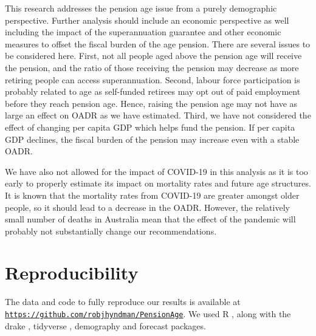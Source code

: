 \documentclass[11pt,a4paper,]{article}
\begin{document}
This research addresses the pension age issue from a purely demographic perspective. Further analysis should include an economic perspective as well including the impact of the superannuation guarantee and other economic measures to offset the fiscal burden of the age pension. There are several issues to be considered here. First, not all people aged above the pension age will receive the pension, and the ratio of those receiving the pension may decrease as more retiring people can access superannuation. Second, labour force participation is probably related to age as self-funded retirees may opt out of paid employment before they reach pension age. Hence, raising the pension age may not have as large an effect on OADR as we have estimated. Third, we have not considered the effect of changing per capita GDP which helps fund the pension. If per capita GDP declines, the fiscal burden of the pension may increase even with a stable OADR.

We have also not allowed for the impact of COVID-19 in this analysis as it is too early to properly estimate its impact on mortality rates and future age structures. It is known that the mortality rates from COVID-19 are greater amongst older people, so it should lead to a decrease in the OADR. However, the relatively small number of deaths in Australia mean that the effect of the pandemic will probably not substantially change our recommendations.

\hypertarget{reproducibility}{%
\section*{Reproducibility}\label{reproducibility}}

The data and code to fully reproduce our results is available at \href{https://github.com/robjhyndman/PensionAge}{\texttt{https://github.com/robjhyndman/PensionAge}}. We used R \autocite{RCore}, along with the drake \autocite{Rdrake}, tidyverse \autocite{Rtidyverse}, demography \autocite{Rdemography} and forecast \autocite{Rforecast} packages.

\printbibliography
\end{document}
